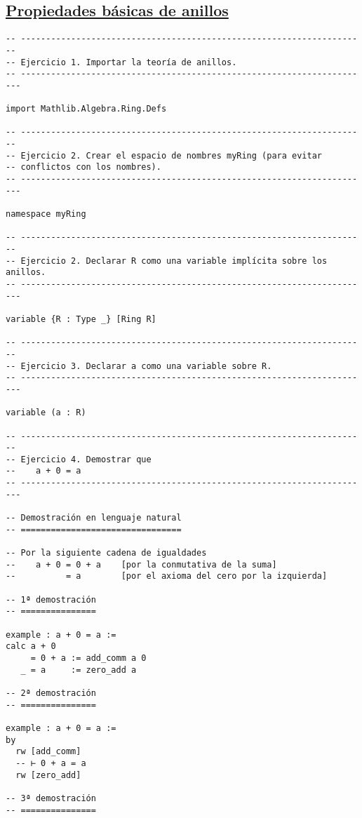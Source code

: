 \subsection{\href{./src/Basicos/Propiedades\_basicas\_de\_anillos.lean}{Propiedades básicas de anillos}}
\label{sec:org1c7f1f3}
\begin{verbatim}
-- ---------------------------------------------------------------------
-- Ejercicio 1. Importar la teoría de anillos.
-- ----------------------------------------------------------------------

import Mathlib.Algebra.Ring.Defs

-- ---------------------------------------------------------------------
-- Ejercicio 2. Crear el espacio de nombres myRing (para evitar
-- conflictos con los nombres).
-- ----------------------------------------------------------------------

namespace myRing

-- ---------------------------------------------------------------------
-- Ejercicio 2. Declarar R como una variable implícita sobre los anillos.
-- ----------------------------------------------------------------------

variable {R : Type _} [Ring R]

-- ---------------------------------------------------------------------
-- Ejercicio 3. Declarar a como una variable sobre R.
-- ----------------------------------------------------------------------

variable (a : R)

-- ---------------------------------------------------------------------
-- Ejercicio 4. Demostrar que
--    a + 0 = a
-- ----------------------------------------------------------------------

-- Demostración en lenguaje natural
-- ================================

-- Por la siguiente cadena de igualdades
--    a + 0 = 0 + a    [por la conmutativa de la suma]
--          = a        [por el axioma del cero por la izquierda]

-- 1ª demostración
-- ===============

example : a + 0 = a :=
calc a + 0
     = 0 + a := add_comm a 0
   _ = a     := zero_add a

-- 2ª demostración
-- ===============

example : a + 0 = a :=
by
  rw [add_comm]
  -- ⊢ 0 + a = a
  rw [zero_add]

-- 3ª demostración
-- ===============


\end{verbatim}
